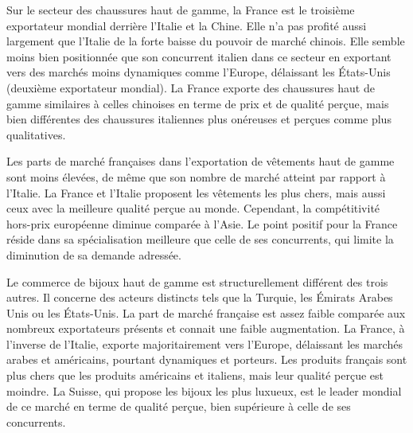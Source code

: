 \documentclass[french,10pt,a4paper]{article}
\begin{document}
\bigskip

Sur le secteur des chaussures haut de gamme, la France est le troisième exportateur mondial derrière l'Italie et la Chine. Elle n'a pas profité aussi largement que l'Italie de la forte baisse du pouvoir de marché chinois. Elle semble moins bien positionnée que son concurrent italien dans ce secteur en exportant vers des marchés moins dynamiques comme l'Europe, délaissant les États-Unis (deuxième exportateur mondial). La France exporte des chaussures haut de gamme similaires à celles chinoises en terme de prix et de qualité perçue, mais bien différentes des chaussures italiennes plus onéreuses et perçues comme plus qualitatives.

\bigskip
Les parts de marché françaises dans l'exportation de vêtements haut de gamme sont moins élevées, de même que son nombre de marché atteint par rapport à l'Italie. La France et l'Italie proposent les vêtements les plus chers, mais aussi ceux avec la meilleure qualité perçue au monde. Cependant, la compétitivité hors-prix européenne diminue comparée à l'Asie. Le point positif pour la France réside dans sa spécialisation meilleure que celle de ses concurrents, qui limite la diminution de sa demande adressée.

\bigskip

Le commerce de bijoux haut de gamme est structurellement différent des trois autres. Il concerne des acteurs distincts tels que la Turquie, les Émirats Arabes Unis ou les États-Unis. La part de marché française est assez faible comparée aux nombreux exportateurs présents et connait une faible augmentation. La France, à l'inverse de l'Italie, exporte majoritairement vers l'Europe, délaissant les marchés arabes et américains, pourtant dynamiques et porteurs. Les produits français sont plus chers que les produits américains et italiens, mais leur qualité perçue est moindre. La Suisse, qui propose les bijoux les plus luxueux, est le leader mondial de ce marché en terme de qualité perçue, bien supérieure à celle de ses concurrents.



\newpage

% 



\newpage
\end{document}
